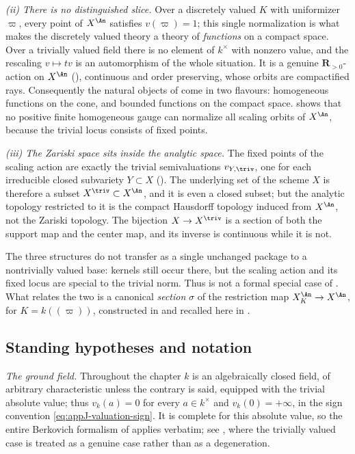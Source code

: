\emph{(ii) There is no distinguished slice.}
Over a discretely valued $K$ with uniformizer $\varpi$, every point of
$X^{\An}$ satisfies $v(\varpi)=1$; this single normalization is what makes
the discretely valued theory a theory of \emph{functions} on a compact space.
Over a trivially valued field there is no element of $k^\times$ with nonzero
value, and the rescaling $v\mapsto tv$ is an automorphism of the whole
situation.  It is a genuine $\mathbf R_{>0}$-action on $X^{\An}$
(), continuous and order preserving, whose
orbits are compactified rays.  Consequently the natural objects of
 come in two flavours: homogeneous functions on the cone, and
bounded functions on the compact space.  
shows that no positive finite homogeneous gauge can normalize all scaling
orbits of $X^{\An}$, because the trivial locus consists of fixed points.

\emph{(iii) The Zariski space sits inside the analytic space.}
The fixed points of the scaling action are exactly the trivial
semivaluations $v_{Y,\triv}$, one for each irreducible closed subvariety
$Y\subset X$ ().  The underlying set of the
scheme $X$ is therefore a subset $X^{\triv}\subset X^{\An}$, and it is
even a closed subset; but the analytic topology restricted to it is the
compact Hausdorff topology induced from $X^{\An}$, not the Zariski topology.
The bijection $X\to X^{\triv}$ is a section of both the support map and the
center map, and its inverse is continuous while it is not.

The three structures do not transfer as a single unchanged package to a
nontrivially valued base: kernels still occur there, but the scaling action
and its fixed locus are special to the trivial norm.  Thus  is
not a formal special case of .  What relates the two is a
canonical \emph{section}
$\sigma$ of the restriction map $X_K^{\An}\to X^{\An}$, for
$K=k(\!(\varpi)\!)$, constructed in  and recalled here
in .

\subsection{Standing hypotheses and notation}
\label{sec:ch32-standing}

\emph{The ground field.}  Throughout the chapter $k$ is an algebraically
closed field, of arbitrary characteristic unless the contrary is said,
equipped with the trivial absolute value; thus $v_k(a)=0$ for every
$a\in k^\times$ and $v_k(0)=+\infty$, in the sign convention
\eqref{eq:appJ-valuation-sign}.  It is complete for this absolute value,
so the entire Berkovich formalism of  applies verbatim;
see , where the trivially valued case is treated as
a genuine case rather than as a degeneration.

